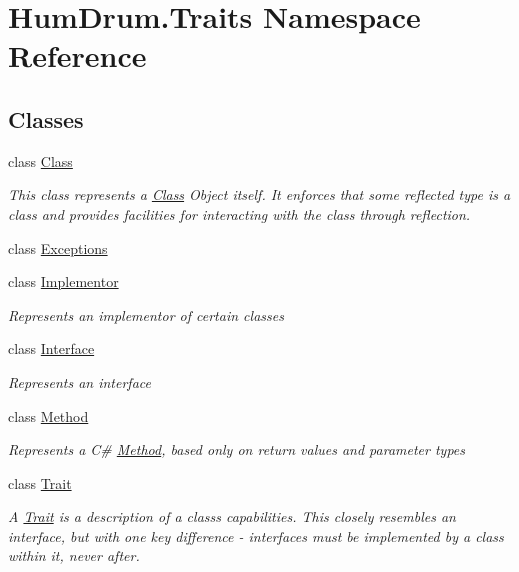 \hypertarget{namespaceHumDrum_1_1Traits}{}\section{Hum\+Drum.\+Traits Namespace Reference}
\label{namespaceHumDrum_1_1Traits}
\subsection*{Classes}
\begin{DoxyCompactItemize}
\item 
class \hyperlink{classHumDrum_1_1Traits_1_1Class}{Class}
\begin{DoxyCompactList}\small\item\em This class represents a \hyperlink{classHumDrum_1_1Traits_1_1Class}{Class} Object itself. It enforces that some reflected type is a class and provides facilities for interacting with the class through reflection. \end{DoxyCompactList}\item 
class \hyperlink{classHumDrum_1_1Traits_1_1Exceptions}{Exceptions}
\item 
class \hyperlink{classHumDrum_1_1Traits_1_1Implementor}{Implementor}
\begin{DoxyCompactList}\small\item\em Represents an implementor of certain classes \end{DoxyCompactList}\item 
class \hyperlink{classHumDrum_1_1Traits_1_1Interface}{Interface}
\begin{DoxyCompactList}\small\item\em Represents an interface \end{DoxyCompactList}\item 
class \hyperlink{classHumDrum_1_1Traits_1_1Method}{Method}
\begin{DoxyCompactList}\small\item\em Represents a C\# \hyperlink{classHumDrum_1_1Traits_1_1Method}{Method}, based only on return values and parameter types \end{DoxyCompactList}\item 
class \hyperlink{classHumDrum_1_1Traits_1_1Trait}{Trait}
\begin{DoxyCompactList}\small\item\em A \hyperlink{classHumDrum_1_1Traits_1_1Trait}{Trait} is a description of a class\textquotesingle{}s capabilities. This closely resembles an interface, but with one key difference -\/ interfaces must be implemented by a class within it, never after. \end{DoxyCompactList}\end{DoxyCompactItemize}
